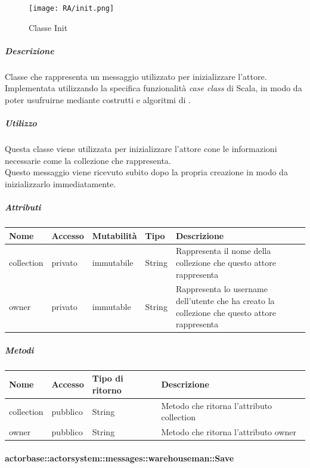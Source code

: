 \documentclass{scalatekids-article}
\begin{document}
\begin{figure}[H]
  \begin{center}
    \texttt{[image: RA/init.png]}
    \caption{Classe Init}
  \end{center}
\end{figure}

\subparagraph{Descrizione}
Classe che rappresenta un messaggio utilizzato per inizializzare l'attore.\\Implementata utilizzando la specifica funzionalità \textit{case class} di Scala,
in modo da poter usufruirne mediante costrutti e algoritmi di
.

\subparagraph{Utilizzo}
Questa classe viene utilizzata per inizializzare l'attore cone le informazioni
necessarie come la collezione che rappresenta.\\Questo messaggio viene
ricevuto subito dopo la propria creazione in modo da inizializzarlo immediatamente.

\subparagraph{Attributi}
\begin{tabular}{| p{2cm} | p{1.5cm} | p{2cm} | p{3cm} | p{8.5cm} |}
  \hline
  Nome & Accesso & Mutabilità & Tipo & Descrizione\\
  \hline
  collection & privato & immutabile & String & Rappresenta il nome della collezione che questo attore rappresenta\\
  \hline
  owner & privato & immutable & String & Rappresenta lo username dell'utente che ha creato la collezione che questo attore rappresenta\\
  \hline
\end{tabular}

\subparagraph{Metodi}
\begin{tabular}{| p{3cm} | p{1.5cm} | p{3.5cm} | p{9cm} |}
  \hline
  Nome & Accesso & Tipo di ritorno & Descrizione\\
  \hline
  collection & pubblico & String & Metodo che ritorna l'attributo collection\\
  \hline
  owner & pubblico & String & Metodo che ritorna l'attributo owner\\
  \hline
\end{tabular}

\paragraph{actorbase::actorsystem::messages::warehouseman::Save}
\label{sec:actorbase::actorsystem::messages::warehouseman::Save}
\end{document}
